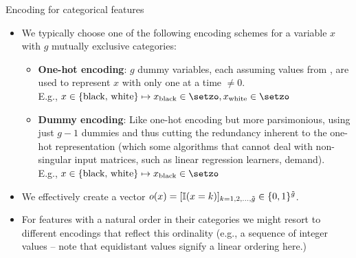 \begin{vbframe}{Encoding for categorical features}

\begin{itemize}
  \small
  \item We typically choose one of the following encoding schemes for a variable 
  $x$ with $g$ mutually exclusive categories:
  \begin{itemize}
    \small
    \item \textbf{One-hot encoding}: $g$ dummy variables, each assuming values 
    from \setzo, are used to represent $x$ with only one at a time $\neq 0$. \\
    E.g., $x \in \{ \text{black, white}\} \mapsto x_{\text{black}} 
    \in \setzo, x_{\text{white}} \in \setzo$
    \item \textbf{Dummy encoding}: Like one-hot encoding but more parsimonious, 
    using just $g - 1$ dummies and thus cutting the redundancy inherent to the 
    one-hot representation (which some algorithms that cannot deal with 
    non-singular input matrices, such as linear regression learners, demand). \\
    E.g., $x \in \{ \text{black, white}\} \mapsto x_{\text{black}} \in \setzo$
  \end{itemize}
  \item We effectively create a vector $o(x) = [\mathbb{I}(x = k)]_{k = 1, 2, 
  \dots, \tilde g} \in \{0,1\}^{\tilde g}$.
  \item For features with a natural order in their categories we might resort 
  to different encodings that reflect this ordinality (e.g., a sequence of 
  integer values -- note that equidistant values signify a linear ordering 
  here.)
\end{itemize}

\end{vbframe}


